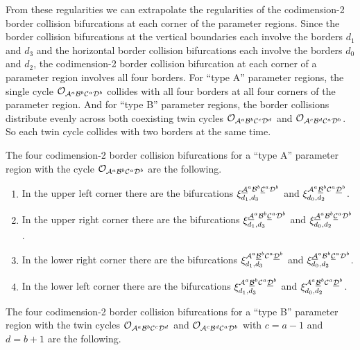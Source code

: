 From these regularities we can extrapolate the regularities of the codimension-2 border collision bifurcations at each corner of the parameter regions.
Since the border collision bifurcations at the vertical boundaries each involve the borders $d_1$ and $d_3$ and the horizontal border collision bifurcations each involve the borders $d_0$ and $d_2$, the codimension-2 border collision bifurcation at each corner of a parameter region involves all four borders.
For ``type A'' parameter regions, the single cycle $\mathcal{O}_{\mathcal{A}^a\mathcal{B}^b\mathcal{C}^a\mathcal{D}^b}$ collides with all four borders at all four corners of the parameter region.
And for ``type B'' parameter regions, the border collisions distribute evenly across both coexisting twin cycles $\mathcal{O}_{\mathcal{A}^a\mathcal{B}^b\mathcal{C}^c\mathcal{D}^d}$ and $\mathcal{O}_{\mathcal{A}^c\mathcal{B}^d\mathcal{C}^a\mathcal{D}^b}$.
So each twin cycle collides with two borders at the same time.

The four codimension-2 border collision bifurcations for a ``type A'' parameter region with the cycle $\mathcal{O}_{\mathcal{A}^a\mathcal{B}^b\mathcal{C}^a\mathcal{D}^b}$ are the following.

\begin{enumerate}
	\item In the upper left corner there are the bifurcations $\xi_{d_1, d_3}^{\underline{\mathcal{A}}^a\mathcal{B}^b\underline{\mathcal{C}}^a\mathcal{D}^b}$ and $\xi_{d_0, d_2}^{\mathcal{A}^a\underline{\mathcal{B}}^b\mathcal{C}^a\underline{\mathcal{D}}^b}$.
	\item In the upper right corner there are the bifurcations $\xi_{d_1, d_3}^{\underline{\mathcal{A}}^a\mathcal{B}^b\underline{\mathcal{C}}^a\mathcal{D}^b}$ and $\xi_{d_0, d_2}^{\underline{\mathcal{A}}^a\mathcal{B}^b\underline{\mathcal{C}}^a\mathcal{D}^b}$.
	\item In the lower right corner there are the bifurcations $\xi_{d_1, d_3}^{\mathcal{A}^a\underline{\mathcal{B}}^b\mathcal{C}^a\underline{\mathcal{D}}^b}$ and $\xi_{d_0, d_2}^{\underline{\mathcal{A}}^a\mathcal{B}^b\underline{\mathcal{C}}^a\mathcal{D}^b}$.
	\item In the lower left corner there are the bifurcations $\xi_{d_1, d_3}^{\mathcal{A}^a\underline{\mathcal{B}}^b\mathcal{C}^a\underline{\mathcal{D}}^b}$ and $\xi_{d_0, d_2}^{\mathcal{A}^a\underline{\mathcal{B}}^b\mathcal{C}^a\underline{\mathcal{D}}^b}$.
\end{enumerate}

\clearpage

The four codimension-2 border collision bifurcations for a ``type B'' parameter region with the twin cycles $\mathcal{O}_{\mathcal{A}^a\mathcal{B}^b\mathcal{C}^c\mathcal{D}^d}$ and $\mathcal{O}_{\mathcal{A}^c\mathcal{B}^d\mathcal{C}^a\mathcal{D}^b}$ with $c = a - 1$ and $d = b + 1$ are the following.

